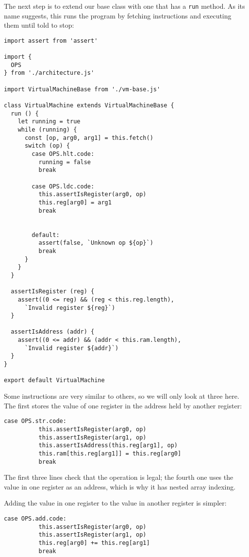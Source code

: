 \documentclass[krantzl]{krantz}
\begin{document}
The next step is to extend our base class with one that has a \texttt{run} method.
As its name suggests,
this runs the program by fetching instructions and executing them until told to stop:


\begin{lstlisting}[frame=tblr]
import assert from 'assert'

import {
  OPS
} from './architecture.js'

import VirtualMachineBase from './vm-base.js'

class VirtualMachine extends VirtualMachineBase {
  run () {
    let running = true
    while (running) {
      const [op, arg0, arg1] = this.fetch()
      switch (op) {
        case OPS.hlt.code:
          running = false
          break

        case OPS.ldc.code:
          this.assertIsRegister(arg0, op)
          this.reg[arg0] = arg1
          break


        default:
          assert(false, `Unknown op ${op}`)
          break
      }
    }
  }

  assertIsRegister (reg) {
    assert((0 <= reg) && (reg < this.reg.length),
      `Invalid register ${reg}`)
  }

  assertIsAddress (addr) {
    assert((0 <= addr) && (addr < this.ram.length),
      `Invalid register ${addr}`)
  }
}

export default VirtualMachine
\end{lstlisting}



Some instructions are very similar to others,
so we will only look at three here.
The first stores the value of one register in the address held by another register:


\begin{lstlisting}[frame=tblr]
        case OPS.str.code:
          this.assertIsRegister(arg0, op)
          this.assertIsRegister(arg1, op)
          this.assertIsAddress(this.reg[arg1], op)
          this.ram[this.reg[arg1]] = this.reg[arg0]
          break
\end{lstlisting}



\noindent The first three lines check that the operation is legal;
the fourth one uses the value in one register as an address,
which is why it has nested array indexing.


Adding the value in one register to the value in another register is simpler:


\begin{lstlisting}[frame=tblr]
        case OPS.add.code:
          this.assertIsRegister(arg0, op)
          this.assertIsRegister(arg1, op)
          this.reg[arg0] += this.reg[arg1]
          break
\end{lstlisting}
\end{document}
